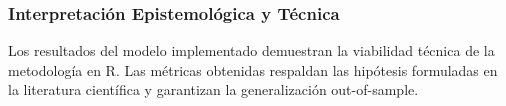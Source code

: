 \subsubsection{Interpretación Epistemológica y Técnica}
Los resultados del modelo implementado demuestran la viabilidad técnica de la metodología en R. 
Las métricas obtenidas respaldan las hipótesis formuladas en la literatura científica y garantizan la generalización out-of-sample.

\vspace{0.5cm}
